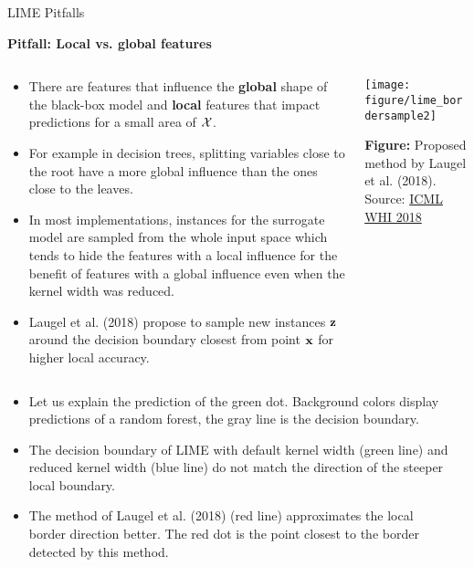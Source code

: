 \documentclass[11pt,compress,t,notes=noshow, aspectratio=169, xcolor=table]{beamer}
\begin{document}
\begin{vbframe}[allowframebreaks]{LIME Pitfalls}

\textbf{Pitfall: Local vs. global features}

\begin{columns}
	\begin{column}{0.78\textwidth}
\begin{itemize}
	\item There are features that influence the \textbf{global} shape of the black-box model and \textbf{local} features that impact predictions for a small area of $\mathcal{X}$. 
	\item For example in decision trees, splitting variables close to the root have a more global influence than the ones close to the leaves. 
	\item In most implementations, instances for the surrogate model are sampled from the whole input space which tends to hide the features with a local influence for the benefit of features with a global influence even when the kernel width was reduced. 
	\item Laugel et al. (2018) propose to sample new instances $\mathbf{z}$ around the decision boundary closest from point $\mathbf{x}$ for higher local accuracy.
\end{itemize}
\end{column}
\begin{column}{0.2\textwidth}

			\vspace{-0.6cm}
		\texttt{[image: figure/lime\_bordersample2]}
		
		\vspace{-0.3cm}
		
		\begin{center}
			\tiny{\textbf{Figure:} Proposed method by Laugel et al. (2018). Source: \href{http://webia.lip6.fr/~laugel/files/WHI_ICML_slides.pdf}{ICML WHI 2018}}
		\end{center}

	
 	\end{column}
\end{columns}
\framebreak
\begin{columns}
	\begin{column}{0.6\textwidth}
		\begin{itemize}
		\item Let us explain the prediction of the green dot. Background colors display predictions of a random forest, the gray line is the decision boundary.
		\item The decision boundary of LIME with default kernel width (green line) and reduced kernel width (blue line) do not match the direction of the steeper local boundary. 
		\item The method of Laugel et al. (2018) (red line) approximates the local border direction better. The red dot is the point closest to the border detected by this method. 
	\end{itemize}
\end{column}
\begin{column}{0.39\textwidth}
\vspace{0.3cm}


\end{column}
\end{columns}
\end{vbframe}
\end{document}
